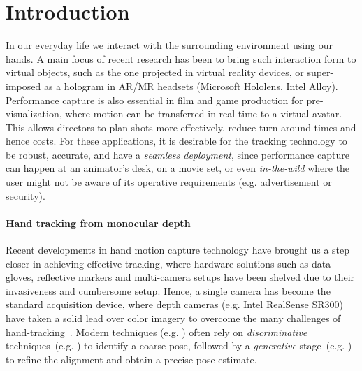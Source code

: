 \newpage
\section{Introduction}
In our everyday life we interact with the surrounding environment using our hands. A main focus of recent research has been to bring such interaction form to virtual objects, such as the one projected in virtual reality devices, %
or super-imposed as a hologram in AR/MR headsets (Microsoft Hololens, Intel Alloy). 
Performance capture is also essential in film and game production for pre-visualization, where motion can be transferred in real-time to a virtual avatar. This allows directors to plan shots more effectively, reduce turn-around times and hence costs.
For these applications, it is desirable for the tracking technology to be robust, accurate, and have a \emph{seamless deployment}, since performance capture can happen at an animator's desk, on a movie set, or even \emph{in-the-wild} where the user might not be aware of its operative requirements (e.g. advertisement or security).

\paragraph{Hand tracking from monocular depth}
Recent developments in hand motion capture technology have brought us a step closer in achieving effective tracking, where hardware solutions such as data-gloves, reflective markers and multi-camera setups have been shelved due to their invasiveness and cumbersome setup.
Hence, a single camera has become the standard acquisition device, where depth cameras (e.g. Intel RealSense SR300) have taken a solid lead over color imagery to overcome the many challenges of hand-tracking~\cite{supancic2015depth}. 
Modern techniques (e.g. \cite{taylor2016joint}) often rely on \emph{discriminative} techniques~(e.g. \cite{valentin2016learning}) to identify a coarse pose, followed by a \emph{generative} stage~(e.g. \cite{tkach2016sphere}) to refine the alignment and obtain a precise pose estimate.


